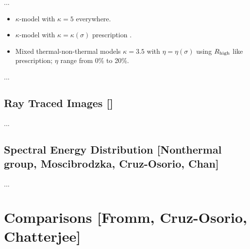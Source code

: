 \documentclass[twocolumn,tighten,dvipsnames,linenumbers]{aastex63}
\begin{document}
...

\begin{itemize}
\item $\kappa$-model with $\kappa = 5$ everywhere.
\item $\kappa$-model with $\kappa = \kappa(\sigma)$ prescription
  \citep{2016ApJ...826...77B}.
\item Mixed thermal-non-thermal models $\kappa = 3.5$ with $\eta =
  \eta(\sigma)$ using ${R_\mathrm{high}}$ like prescription; $\eta$ range from 0\%
  to 20\%.
\end{itemize}

...

\subsection{Ray Traced Images
  []}
\label{sec:images}

...

\subsection{Spectral Energy Distribution
  [Nonthermal group, Moscibrodzka, Cruz-Osorio, Chan]}
\label{sec:SED}

...





\section{Comparisons
  [Fromm, Cruz-Osorio, Chatterjee]}
\label{sec:comparisons}
\end{document}
